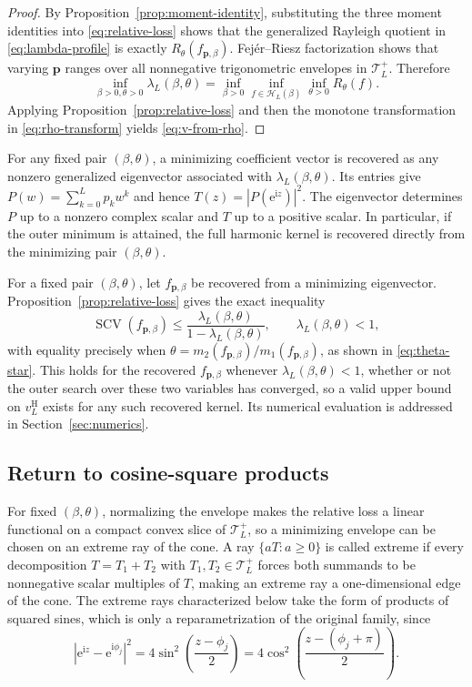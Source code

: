 \documentclass[11pt]{article}
\numberwithin{equation}{section}
\theoremstyle{remark}
\newcommand{\SCV}{\operatorname{SCV}}
\newcommand{\e}{\mathrm e}
\newcommand{\ii}{\mathrm i}
\newcommand{\Tcal}{\mathcal T}
\newcommand{\Hcal}{\mathcal H}
\newcommand{\abs}[1]{\left|#1\right|}
\newcommand{\vH}{v^{\mathrm H}}
\begin{document}
\begin{proof}
By Proposition~\ref{prop:moment-identity}, substituting the three moment identities into \eqref{eq:relative-loss} shows that the generalized Rayleigh quotient in \eqref{eq:lambda-profile} is exactly $R_\theta(f_{\bm p,\beta})$. Fej\'er--Riesz factorization shows that varying $\bm p$ ranges over all nonnegative trigonometric envelopes in $\Tcal_L^+$. Therefore
\[
  \inf_{\beta>0,\theta>0}\lambda_L(\beta,\theta)
  =\inf_{\beta>0}\inf_{f\in\Hcal_L(\beta)}\inf_{\theta>0}R_\theta(f).
\]
Applying Proposition~\ref{prop:relative-loss} and then the monotone transformation in \eqref{eq:rho-transform} yields \eqref{eq:v-from-rho}.
\end{proof}

For any fixed pair $(\beta,\theta)$, a minimizing coefficient vector is recovered as any nonzero generalized eigenvector associated with $\lambda_L(\beta,\theta)$. Its entries give $P(w)=\sum_{k=0}^Lp_kw^k$ and hence $T(z)=|P(\e^{\ii z})|^2$. The eigenvector determines $P$ up to a nonzero complex scalar and $T$ up to a positive scalar. In particular, if the outer minimum is attained, the full harmonic kernel is recovered directly from the minimizing pair $(\beta,\theta)$.

For a fixed pair $(\beta,\theta)$, let $f_{\bm p,\beta}$ be recovered from a minimizing eigenvector. Proposition~\ref{prop:relative-loss} gives the exact inequality
\[
  \SCV(f_{\bm p,\beta})
  \leq\frac{\lambda_L(\beta,\theta)}{1-\lambda_L(\beta,\theta)},
  \qquad \lambda_L(\beta,\theta)<1,
\]
with equality precisely when $\theta=m_2(f_{\bm p,\beta})/m_1(f_{\bm p,\beta})$, as shown in \eqref{eq:theta-star}. This holds for the recovered $f_{\bm p,\beta}$ whenever $\lambda_L(\beta,\theta)<1$, whether or not the outer search over these two variables has converged, so a valid upper bound on $\vH_L$ exists for any such recovered kernel. Its numerical evaluation is addressed in Section~\ref{sec:numerics}.

\subsection{Return to cosine-square products}

For fixed $(\beta,\theta)$, normalizing the envelope makes the relative loss a linear functional on a compact convex slice of $\Tcal_L^+$, so a minimizing envelope can be chosen on an extreme ray of the cone. A ray $\{aT:a\geq0\}$ is called extreme if every decomposition $T=T_1+T_2$ with $T_1,T_2\in\Tcal_L^+$ forces both summands to be nonnegative scalar multiples of $T$, making an extreme ray a one-dimensional edge of the cone. The extreme rays characterized below take the form of products of squared sines, which is only a reparametrization of the original family, since
\[
\abs{\e^{\ii z}-\e^{\ii\phi_j}}^2
=4\sin^2\left(\frac{z-\phi_j}{2}\right)
=4\cos^2\left(\frac{z-(\phi_j+\pi)}{2}\right).
\]
\end{document}
